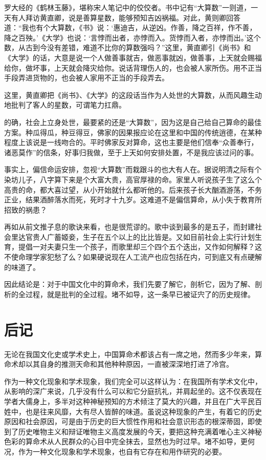 \documentclass[a5paper,oneside,12pt]{ctexbook}
\begin{document}
{{罗大经的《鹤林玉藤》，堪称宋人笔记中的佼佼者。书中记有“大算数”一则道，一天有人拜访黄直卿，说是善算星数，能够预知吉凶祸福。对此，黄则卿回答道：“我也有个大算数，《书》说：‘惠迪吉，从逆凶。作善，降之百祥，作不善，降之百殃。’《大学》也说：‘言悖而出者，亦悖而入。货悖而入者，亦悖而出。’这个数，从古到今没有差错，难道不比你的算数强吗？”这里，黄直卿引《尚书》和《大学》的话，大意是说一个人做善事就吉，做恶事就凶，做善事，上天就会赐福给你，做坏事，上天就会降灾给你。说话背理伤人的，也会被人家所伤。用不正当手段弄进货物的，也会被人家用不正当的手段弄去。

这里，黄直卿把《尚书》、《大学》的这段话当作为人处世的大算数，从而风趣生动地批判了客人的星数，可谓笔力扛鼎。

的确，社会上立身处世，最要紧的还是“大算数”，因为这是自己给自己算命的最佳方案。种瓜得瓜，种豆得豆，佛家的因果报应论在这里和中国的传统逍德，在某种程度上该说是一线吻合的。平时佛家反对算命，这也主要是他们信奉“众善奉行，诸恶莫作”的信条，好事归我做，至于上天如何安排处置，不是我应该过问的事。

事实上，偏信命运安排，忽视“大算数”而栽跟斗的也大有人在。据说明清之际有个染坊儿子，八字算下来是个大富大贵，高官厚禄的命。家里人听说孩子生了这么个高贵的命，都大喜过望，从小开始就什么都听他的。后来孩子长大酗酒游荡，不务正业，结果酒醉落水而死，死时才十九岁。这难道不是偏信算命，从小失于教育所招致的祸患？

再如从前文推子息的歌诀来看，也是很荒谬的。歌中谈到最多的是五子，而封建社会里达官贵人广蓄姬妾，生子在五个以上的比比皆是。又如目前社会上实行计划生育，提倡一对夫妻只生一个孩子，而歌里却三个四个五个迭出，又作如何解释？这不使命理学家犯愁了么？如果硬说现在人工流产也应包括在内，可到底又有点硬解的味道了。

因此结论是：对于中国文化中的算命术，我们先要了解它，剖析它，因为了解、剖析的全过程，就是批判的全过程。堵不如导，这一条早已被证宍了的历史规律。



\chapter{后记}

无论在我国文化史或学术史上，中国算命术都该占有一席之地，然而多少年来，算命术却以其自身的推测天命和其他种种原因，一直被深深地打进了冷宫。

作为一种文化现象和学术现象，我们完全可以这样认为：在我国所有学术文化中，从影响的深广来说，几乎没有什么可以和它分庭抗礼，并肩起坐的。这不仅表现在学者大儒身上，多半对这种神秘预知的方术倾注了莫大的兴趣，并且在广大平民百姓中，也是往来风靡，大有尽人皆醉的味道。虽说这种现象的产生，有着它的历史原因和社会原因，可是由于历史的巨大惯性作用和社会意识形态的根深蒂固，即使到了历史唯物主义和辩证唯物主义高度发展的今天，要把这种充满着唯心主义神秘色彩的算命术从人民群众的心目中完全抹去，显然也为时过早。堵不如导，更何况，作为一种文化现象和学术现象，也自有它存在和用作研究的必要。

}}
\end{document}
